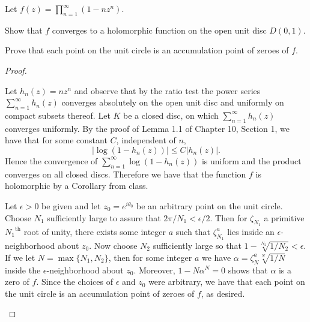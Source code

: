 \documentclass[10pt]{amsart}
\begin{document}
\begin{thm}
  \label{Ex2}
  Let $f(z) = \prod_{n=1}^{\infty} (1 - nz^n)$.
  \begin{alphaenum}
  \item
    Show that $f$ converges to a holomorphic function on the open unit disc $D(0,1)$.
  \item
    Prove that each point on the unit circle is an accumulation point of zeroes of $f$.
  \end{alphaenum}
  
  \begin{proof}
    \begin{alphaenum}
    \item
      Let $h_n(z) = nz^n$ and observe that by the ratio test the power series $\sum_{n=1}^{\infty}h_n(z)$ converges absolutely on the open unit disc and uniformly on compact subsets thereof.
      Let $K$ be a closed disc, on which $\sum_{n=1}^{\infty} h_n(z)$ converges uniformly.
      By the proof of Lemma 1.1 of Chapter 10, Section 1, we have that for some constant $C$, independent of $n$, $$|\log(1 - h_n(z))| \leq C|h_n(z)|.$$
      Hence the convergence of $\sum_{n=1}^{\infty} \log(1 - h_n(z))$ is uniform and the product converges on all closed discs.
      Therefore we have that the function $f$ is holomorphic by a Corollary from class.
    \item
      Let $\epsilon > 0$ be given and let $z_0 = e^{i\theta_0}$ be an arbitrary point on the unit circle.
      Choose $N_1$ sufficiently large to assure that  $2\pi/{N_1} < \epsilon/2$.
      Then for $\zeta_{N_1}$ a primitive ${N_1}^{\text{th}}$ root of unity, there exists some integer $a$ such that $\zeta_{N_1}^a$ lies inside an $\epsilon$-neighborhood about $z_0$.
      Now choose $N_2$ sufficiently large so that $1 - \sqrt[N_2]{1/N_2} < \epsilon$. 
      If we let $N = \max\{N_1,N_2\}$, then for some integer $a$ we have $\alpha = \zeta_N^a\sqrt[N]{1/N}$ inside the $\epsilon$-neighborhood about $z_0$.
      Moreover, $1 - N\alpha^N = 0$ shows that $\alpha$ is a zero of $f$.
      Since the choices of $\epsilon$ and $z_0$ were arbitrary, we have that each point on the unit circle is an accumulation point of zeroes of $f$, as desired.
    \end{alphaenum}
  \end{proof}
\end{thm}
\end{document}
